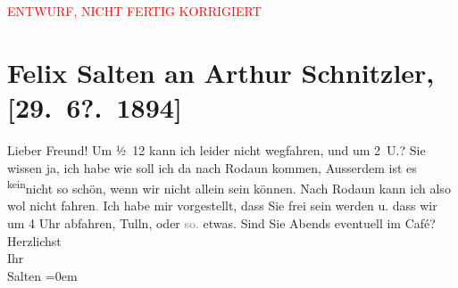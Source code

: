 
\begin{center}
            \textcolor{red}{ENTWURF, NICHT FERTIG KORRIGIERT}
                      \end{center}
            
         \renewcommand{\erwaehnteOrte}{Orte: Rodaun, Tulln an der Donau, Wien}
         \renewcommand{\erwaehnteWerke}{}
               \section[Felix Salten an Arthur Schnitzler, {[}29. 6?. 1894{]}]{ Felix Salten an Arthur Schnitzler, {[}29. 6?. 1894{]}}\nopagebreak{}\rehead{ }\begin{ledgroupsized}[t]{13cm}\normalsize\beginnumbering \toendnotes[C]{\smallbreak\pagebreak[2]} 
\toendnotes[C]{\smallbreak}\pstart
           \noindent{}{\pb}Lieber Freund! Um ½ 12 kann ich leider nicht wegfahren, und um 2 U.?
               Sie wissen ja, ich habe \label{K_L03139-1v}\label{K_L03139-1h} wie soll ich da nach Rodaun kommen,
               Ausserdem {\pb}ist es \substVorne{}\textsuperscript{kein}\substDazwischen{}nic\substHinten{}ht so schön, wenn wir nicht allein sein können. \pend
           \pstart
           Nach Rodaun kann ich also wol nicht
                  fahren\textcolor{gray}{.} Ich habe mir vorgestellt, dass Sie frei sein werden u.
               dass wir um 4 Uhr abfahren, Tulln, oder
                  \textcolor{gray}{so.} etwas. Sind Sie {\pb}Abends eventuell im Café? \pend
           \pstart
           Herzlichst {\\[\baselineskip]}Ihr {\\[\baselineskip]}\spacefill\mbox{Salten}\pend
           \leftskip=0em{}
         
         \endnumbering{}\end{ledgroupsized}\begin{anhang}\end{anhang}\newcommand{\dateiname}{L03139}\newcommand{\titel}{Felix Salten an Arthur Schnitzler, [29. 6?. 1894]}\newcommand{\editorInnen}{Martin Anton Müller und Laura Untner}
      